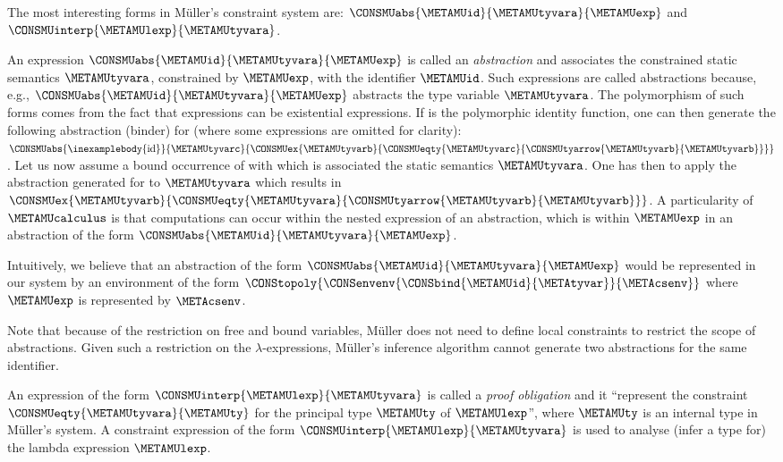 \documentclass{jfp1}
\begin{document}
The most interesting forms in M\"{u}ller's constraint system are:
$\CONSMUabs{\METAMUid}{\METAMUtyvara}{\METAMUexp}$ and
$\CONSMUinterp{\METAMUlexp}{\METAMUtyvara}$.

An expression $\CONSMUabs{\METAMUid}{\METAMUtyvara}{\METAMUexp}$ is
called an \emph{abstraction} and associates the constrained static
semantics $\METAMUtyvara$, constrained by $\METAMUexp$, with the
identifier $\METAMUid$.
Such expressions are called abstractions because, e.g.,
$\CONSMUabs{\METAMUid}{\METAMUtyvara}{\METAMUexp}$
abstracts the type variable $\METAMUtyvara$.
%
The polymorphism of such forms comes from the fact that
expressions can be existential expressions.  If  is
the polymorphic identity function, one can then generate the following
abstraction (binder) for  (where some expressions
are omitted for clarity):
$\CONSMUabs
{\mbox{\inexamplebody{id}}}
{\METAMUtyvarc}
{\CONSMUex
  {\METAMUtyvarb}
  {\CONSMUeqty
    {\METAMUtyvarc}
    {\CONSMUtyarrow{\METAMUtyvarb}{\METAMUtyvarb}}
  }
}$.
Let us now assume a bound occurrence of  with which is
associated the static semantics $\METAMUtyvara$.  One has then to
apply the abstraction generated for  to
$\METAMUtyvara$ which results in
$\CONSMUex
{\METAMUtyvarb}
{\CONSMUeqty
  {\METAMUtyvara}
  {\CONSMUtyarrow{\METAMUtyvarb}{\METAMUtyvarb}}
}$.
A particularity of $\METAMUcalculus$ is that computations can occur
within the nested expression of an abstraction, which is within
$\METAMUexp$ in an abstraction of the form
$\CONSMUabs{\METAMUid}{\METAMUtyvara}{\METAMUexp}$.


Intuitively, we believe that an abstraction of the form
$\CONSMUabs{\METAMUid}{\METAMUtyvara}{\METAMUexp}$ would be
represented in our system by an environment of the form
$\CONStopoly{\CONSenvenv{\CONSbind{\METAMUid}{\METAtyvar}}{\METAcsenv}}$
where $\METAMUexp$ is represented by $\METAcsenv$.

Note that because of the restriction on free and bound variables,
M\"{u}ller does not need to define local constraints to restrict the
scope of abstractions.  Given such a restriction on the
$\lambda$-expressions, M\"{u}ller's inference algorithm cannot
generate two abstractions for the same identifier.


An expression of the form $\CONSMUinterp{\METAMUlexp}{\METAMUtyvara}$
is called a \emph{proof obligation} and it ``represent the constraint
$\CONSMUeqty{\METAMUtyvara}{\METAMUty}$  for the principal type
$\METAMUty$ of $\METAMUlexp$'', where $\METAMUty$ is an internal type
in M\"{u}ller's system.
%
A constraint expression of the form
$\CONSMUinterp{\METAMUlexp}{\METAMUtyvara}$ is used to analyse (infer
a type for) the lambda expression $\METAMUlexp$.
\end{document}
